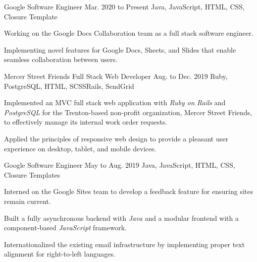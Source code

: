 
\begin{cventry}
    {Google}
    {Software Engineer}
    {Mar. 2020 to Present}
    {Java, JavaScript, HTML, CSS, Closure Template}{}
    \begin{cvitems}
        \item Working on the Google Docs Collaboration team as a full stack software engineer.
        \item Implementing novel features for Google Docs, Sheets, and Slides that enable seamless collaboration between users.
    \end{cvitems}
\end{cventry}

\begin{cventry}
    {Mercer Street Friends}
    {Full Stack Web Developer}
    {Aug. to Dec. 2019}
    {Ruby, PostgreSQL, HTML, SCSS}{Rails, SendGrid}
    \begin{cvitems}
        \item Implemented an MVC full stack web application with \textsl{Ruby on Rails} and \textsl{PostgreSQL} for the Trenton-based non-profit organization, Mercer Street Friends, to effectively manage its internal work order requests.
        \item Applied the principles of responsive web design to provide a pleasant user experience on desktop, tablet, and mobile devices.
    \end{cvitems}
\end{cventry}

\begin{cventry}
    {Google}
    {Software Engineer}
    {May to Aug. 2019}
    {Java, JavaScript, HTML, CSS, Closure Templates}{}
    \begin{cvitems}
        \item Interned on the Google Sites team to develop a feedback feature for ensuring sites remain current.
        \item Built a fully asynchronous backend with \textsl{Java} and a modular frontend with a component-based \textsl{JavaScript} framework.
        \item Internationalized the existing email infrastructure by implementing proper text alignment for right-to-left languages. 
    \end{cvitems}
\end{cventry}

\begin{comment}
    \begin{cventry}
        {The College of New Jersey (TCNJ)}
        {Computer Science Department Tutor}
        {Apr. 2018 to May 2019}
        {Java, C++, C, Ruby, PostgreSQL, Regular Expressions}{Rails}
        \begin{cvitems}
            \item Tutoring TCNJ students in computer science coursework concerning topics such as object-oriented programming, data structures, discrete math, algorithms, computer architecture, operating systems, databases, and software engineering.
        \end{cvitems}
    \end{cventry}
\end{comment}

